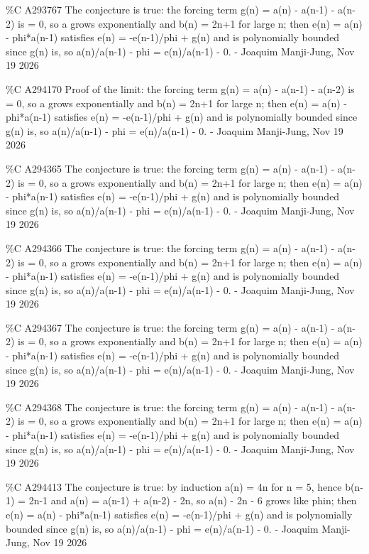 {\%C A293767 The conjecture is true: the forcing term g(n) = a(n) - a(n-1) - a(n-2) is = 0, so a grows exponentially and b(n) = 2n+1 for large n; then e(n) = a(n) - phi*a(n-1) satisfies e(n) = -e(n-1)/phi + g(n) and is polynomially bounded since g(n) is, so a(n)/a(n-1) - phi = e(n)/a(n-1) - 0. - Joaquim Manji-Jung, Nov 19 2026\par
\%C A294170 Proof of the limit: the forcing term g(n) = a(n) - a(n-1) - a(n-2) is = 0, so a grows exponentially and b(n) = 2n+1 for large n; then e(n) = a(n) - phi*a(n-1) satisfies e(n) = -e(n-1)/phi + g(n) and is polynomially bounded since g(n) is, so a(n)/a(n-1) - phi = e(n)/a(n-1) - 0. - Joaquim Manji-Jung, Nov 19 2026\par
\%C A294365 The conjecture is true: the forcing term g(n) = a(n) - a(n-1) - a(n-2) is = 0, so a grows exponentially and b(n) = 2n+1 for large n; then e(n) = a(n) - phi*a(n-1) satisfies e(n) = -e(n-1)/phi + g(n) and is polynomially bounded since g(n) is, so a(n)/a(n-1) - phi = e(n)/a(n-1) - 0. - Joaquim Manji-Jung, Nov 19 2026\par
\%C A294366 The conjecture is true: the forcing term g(n) = a(n) - a(n-1) - a(n-2) is = 0, so a grows exponentially and b(n) = 2n+1 for large n; then e(n) = a(n) - phi*a(n-1) satisfies e(n) = -e(n-1)/phi + g(n) and is polynomially bounded since g(n) is, so a(n)/a(n-1) - phi = e(n)/a(n-1) - 0. - Joaquim Manji-Jung, Nov 19 2026\par
\%C A294367 The conjecture is true: the forcing term g(n) = a(n) - a(n-1) - a(n-2) is = 0, so a grows exponentially and b(n) = 2n+1 for large n; then e(n) = a(n) - phi*a(n-1) satisfies e(n) = -e(n-1)/phi + g(n) and is polynomially bounded since g(n) is, so a(n)/a(n-1) - phi = e(n)/a(n-1) - 0. - Joaquim Manji-Jung, Nov 19 2026\par
\%C A294368 The conjecture is true: the forcing term g(n) = a(n) - a(n-1) - a(n-2) is = 0, so a grows exponentially and b(n) = 2n+1 for large n; then e(n) = a(n) - phi*a(n-1) satisfies e(n) = -e(n-1)/phi + g(n) and is polynomially bounded since g(n) is, so a(n)/a(n-1) - phi = e(n)/a(n-1) - 0. - Joaquim Manji-Jung, Nov 19 2026\par
\%C A294413 The conjecture is true: by induction a(n) = 4n for n = 5, hence b(n-1) = 2n-1 and a(n) = a(n-1) + a(n-2) - 2n, so a(n) - 2n - 6 grows like phin; then e(n) = a(n) - phi*a(n-1) satisfies e(n) = -e(n-1)/phi + g(n) and is polynomially bounded since g(n) is, so a(n)/a(n-1) - phi = e(n)/a(n-1) - 0. - Joaquim Manji-Jung, Nov 19 2026\par
}
